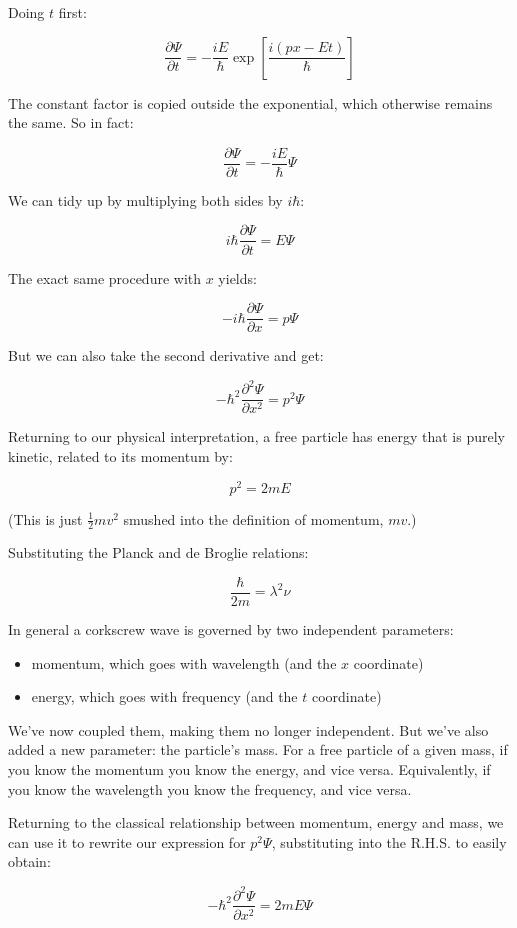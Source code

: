 Doing $t$ first:

$$
\frac{\partial \Psi}{\partial t}
=
-\frac{iE}{\hbar}
\exp \left[ {\frac{i(px - Et)}{\hbar}} \right]
$$

The constant factor is copied outside the exponential, which otherwise remains the same. So in fact:

$$
\frac{\partial \Psi}{\partial t}
=
-\frac{iE}{\hbar}
\Psi
$$

We can tidy up by multiplying both sides by $i\hbar$:

$$
i\hbar \frac{\partial \Psi}{\partial t}
= E \Psi
$$

The exact same procedure with $x$ yields:

$$
- i\hbar \frac{\partial \Psi}{\partial x}
= p \Psi
$$

But we can also take the second derivative and get:

$$
- \hbar^2 \frac{\partial^2 \Psi}{\partial x^2}
= p^2 \Psi
$$

Returning to our physical interpretation, a free particle has energy that is purely kinetic, related to its momentum by:

$$
p^2 = 2m E
$$

(This is just $\frac{1}{2}mv^2$ smushed into the definition of momentum, $mv$.)

Substituting the Planck and de Broglie relations:

$$
\frac{\hbar}{2m} = \lambda^2\nu
$$

In general a corkscrew wave is governed by two independent parameters:

\begin{itemize}
  \item momentum, which goes with wavelength (and the $x$ coordinate)
  \item energy, which goes with frequency (and the $t$ coordinate)
\end{itemize}

We've now coupled them, making them no longer independent. But we've also added a new parameter: the particle's mass. For a free particle of a given mass, if you know the momentum you know the energy, and vice versa. Equivalently, if you know the wavelength you know the frequency, and vice versa.

Returning to the classical relationship between momentum, energy and mass, we can use it to rewrite our expression for $p^2 \Psi$, substituting into the R.H.S. to easily obtain:

$$
- \hbar^2 \frac{\partial^2 \Psi}{\partial x^2}
= 2mE\Psi
$$

